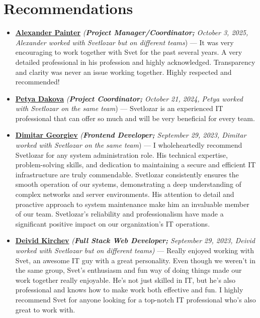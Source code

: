 \documentclass[a4paper, 10pt]{article}
\begin{document}
	\section*{Recommendations}
\begin{itemize}
	
			\item \textbf{\href{https://www.linkedin.com/in/alexander-painter-46281b25b/}{Alexander Painter}} \textit{(\textbf{Project Manager/Coordinator;} October 3, 2025, Alexander worked with Svetlozar but on different teams}) — It was very encouraging to work together with Svet for the past several years. A very detailed professional in his profession and highly acknowledged. Transparency and clarity was never an issue working together. Highly respected and recommended! \\
	
		\item \textbf{\href{https://www.linkedin.com/in/petya-dakova-3b37162a2/}{Petya Dakova}} \textit{(\textbf{Project Coordinator;} October 21, 2024, Petya worked with Svetlozar on the same team}) — Svetlozar is an experienced IT professional that can offer so much and will be very beneficial for every team. \\
	
	\item \textbf{\href{https://www.linkedin.com/in/dimitar-georgiev-29a6ab144/}{Dimitar
			Georgiev}} \textit{(\textbf{Frontend Developer;} September 29, 2023, Dimitar worked with Svetlozar on the same team}) — I wholeheartedly recommend Svetlozar for any system
	administration role. His technical expertise, problem-solving skills, and dedication
	to maintaining a secure and efficient IT infrastructure are truly commendable.
	Svetlozar consistently ensures the smooth operation of our systems, demonstrating
	a deep understanding of complex networks and server environments. His
	attention to detail and proactive approach to system maintenance make him
	an invaluable member of our team. Svetlozar’s reliability and professionalism
	have made a significant positive impact on our organization’s IT operations.\\
	
	\item \textbf{\href{https://www.linkedin.com/in/deivid-kirchev-00378b252/}{Deivid
			Kirchev}} \textit{(\textbf{Full Stack Web Developer;} September 29, 2023, Deivid worked with Svetlozar but on different teams)} — Really enjoyed working with Svet, an awesome IT guy with a great
	personality. Even though we weren’t in the same group, Svet’s enthusiasm and
	fun way of doing things made our work together really enjoyable. He’s not
	just skilled in IT, but he’s also professional and knows how to make work both
	effective and fun. I highly recommend Svet for anyone looking for a top-notch
	IT professional who’s also great to work with.\\
	

\end{itemize}
\end{document}
